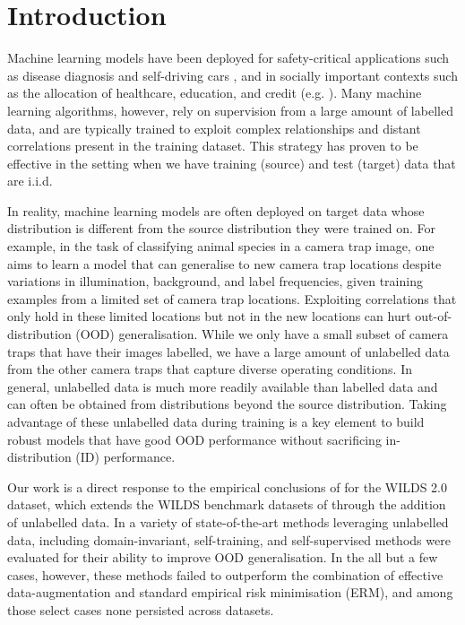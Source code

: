 \section{Introduction}\label{sec:intro}
Machine learning models have been deployed for safety-critical applications such as disease
diagnosis \citep{watson2019clinical} and self-driving cars \citep{yu2020bdd100k}, and in socially
important contexts such as the allocation of healthcare, education, and credit (e.g.
\cite{DunYiLanReetal19, HurAde17}). 
%
%
Many machine learning algorithms, however, rely on supervision from a large amount of labelled
data, and are typically trained to exploit complex relationships and distant correlations present
in the training dataset. 
%
This strategy has proven to be effective in the setting when we have training (source) and test
(target) data that are i.i.d.

In reality, machine learning models are often deployed on target data whose distribution is
different from the source distribution they were trained on. 
%
For example, in the task of classifying animal species in a camera trap image, one aims to learn a
model that can generalise to new camera trap locations despite variations in illumination,
background, and label frequencies, given training examples from a limited set of camera trap
locations.
%
Exploiting correlations that only hold in these limited locations but not in the new locations can
hurt out-of-distribution (OOD) generalisation.
%
While we only have a small subset of camera traps that have their images labelled, we have a large
amount of unlabelled data from the other camera traps that capture diverse operating conditions. 
%
In general, unlabelled data is much more readily available than labelled data and can often be
obtained from distributions beyond the source distribution.
%
Taking advantage of these unlabelled data during training is a key element to build robust models
that have good OOD performance without sacrificing in-distribution (ID) performance.
%

Our work is a direct response to the empirical conclusions of \cite{SagWeiLeeGaoetal22} for the
WILDS 2.0 dataset, which extends the WILDS benchmark datasets of \cite{koh2021wilds} through the
addition of unlabelled data. %
In \citet{SagWeiLeeGaoetal22} a variety of state-of-the-art methods leveraging unlabelled data, including
domain-invariant, self-training, and self-supervised methods were evaluated for their ability to
improve OOD generalisation.
In the all but a few cases, however, these methods failed to outperform the combination of effective
data-augmentation and standard empirical risk minimisation (ERM), and among those select cases
none persisted across datasets.

